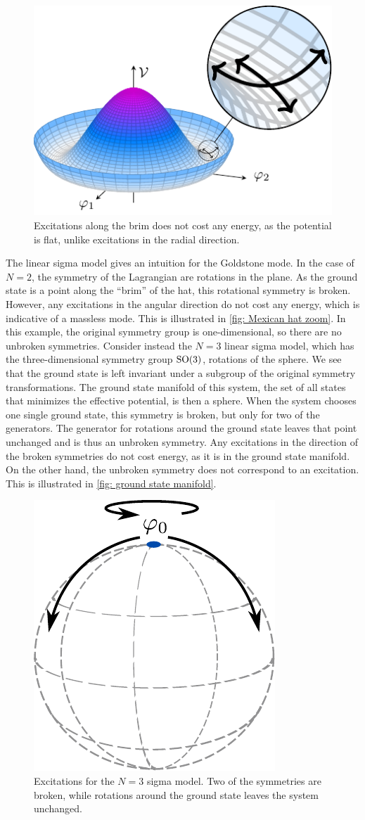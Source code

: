 \begin{figure}[ht]
    \centering
    \hspace*{2.5cm}
    \includegraphics[width=.6\linewidth]{figurer/mexican_hat_zoom.pdf}
    \caption{Excitations along the brim does not cost any energy, as the potential is flat, unlike excitations in the radial direction.}
    \label{fig: Mexican hat zoom}
\end{figure}

The linear sigma model gives an intuition for the Goldstone mode.
In the case of $N = 2$, the symmetry of the Lagrangian are rotations in the plane.
As the ground state is a point along the ``brim'' of the hat, this rotational symmetry is broken.
However, any excitations in the angular direction do not cost any energy, which is indicative of a massless mode.
This is illustrated in \autoref{fig: Mexican hat zoom}.
In this example, the original symmetry group is one-dimensional, so there are no unbroken symmetries.
Consider instead the $N=3$ linear sigma model, which has the three-dimensional symmetry group $\text{SO}(3)$, rotations of the sphere.
We see that the ground state is left invariant under a subgroup of the original symmetry transformations.
The ground state manifold of this system, the set of all states that minimizes the effective potential, is then a sphere.
When the system chooses one single ground state, this symmetry is broken, but only for two of the generators. 
The generator for rotations around the ground state leaves that point unchanged and is thus an unbroken symmetry.
Any excitations in the direction of the broken symmetries do not cost energy, as it is in the ground state manifold.
On the other hand, the unbroken symmetry does not correspond to an excitation.
This is illustrated in \autoref{fig: ground state manifold}.

\begin{figure}[h]
    \centering
    \includegraphics[width=.35\linewidth]{figurer/SU(3).pdf}
    \caption{Excitations for the $N=3$ sigma model. Two of the symmetries are broken, while rotations around the ground state leaves the system unchanged.}
    \label{fig: ground state manifold}
\end{figure}

